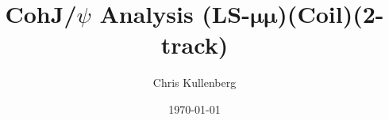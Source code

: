 \title{CohJ/$\psi$ Analysis (\textbf{LS}-$\boldsymbol{\mu\mu}$)(\textbf{Coil})(\textbf{2-track})}
\author{Chris Kullenberg}
\date{\today}
